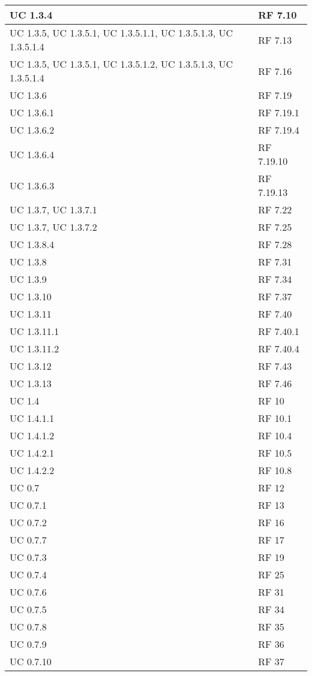 {\begin{longtable} [c]{| p{4cm} | p{4cm} |}
 \hline 
UC 1.3.4 & RF 7.10\\ 
 \hline 
UC 1.3.5, UC 1.3.5.1, UC 1.3.5.1.1, UC 1.3.5.1.3, UC 1.3.5.1.4 & RF 7.13\\ 
 \hline 
UC 1.3.5, UC 1.3.5.1, UC 1.3.5.1.2, UC 1.3.5.1.3, UC 1.3.5.1.4 & RF 7.16\\ 
 \hline 
UC 1.3.6 & RF 7.19\\ 
 \hline 
UC 1.3.6.1 & RF 7.19.1\\ 
 \hline 
UC 1.3.6.2 & RF 7.19.4\\ 
 \hline 
UC 1.3.6.4 & RF 7.19.10\\ 
 \hline 
UC 1.3.6.3 & RF 7.19.13\\ 
 \hline 
UC 1.3.7, UC 1.3.7.1 & RF 7.22\\ 
 \hline 
UC 1.3.7, UC 1.3.7.2 & RF 7.25\\ 
 \hline 
UC 1.3.8.4 & RF 7.28\\ 
 \hline 
UC 1.3.8 & RF 7.31\\ 
 \hline 
UC 1.3.9 & RF 7.34\\ 
 \hline 
UC 1.3.10 & RF 7.37\\ 
 \hline 
UC 1.3.11 & RF 7.40\\ 
 \hline 
UC 1.3.11.1 & RF 7.40.1\\ 
 \hline 
UC 1.3.11.2 & RF 7.40.4\\ 
 \hline 
UC 1.3.12 & RF 7.43\\ 
 \hline 
UC 1.3.13 & RF 7.46\\ 
 \hline 
UC 1.4 & RF 10\\ 
 \hline 
UC 1.4.1.1 & RF 10.1\\ 
 \hline 
UC 1.4.1.2 & RF 10.4\\ 
 \hline 
UC 1.4.2.1 & RF 10.5\\ 
 \hline 
UC 1.4.2.2 & RF 10.8\\ 
 \hline 
UC 0.7 & RF 12\\ 
 \hline 
UC 0.7.1 & RF 13\\ 
 \hline 
UC 0.7.2 & RF 16\\ 
 \hline 
UC 0.7.7 & RF 17\\ 
 \hline 
UC 0.7.3 & RF 19\\ 
 \hline 
UC 0.7.4 & RF 25\\ 
 \hline 
UC 0.7.6 & RF 31\\ 
 \hline 
UC 0.7.5 & RF 34\\ 
 \hline 
UC 0.7.8 & RF 35\\ 
 \hline 
UC 0.7.9 & RF 36\\ 
 \hline 
UC 0.7.10 & RF 37\\ 

\end{longtable}}

